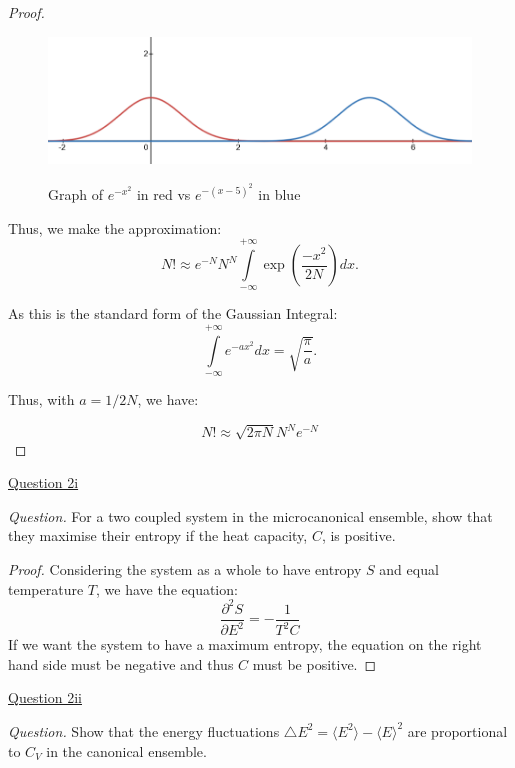 \documentclass[11pt]{article}
\begin{document}
\begin{proof}
\begin{figure}[H]
\centering \includegraphics[scale=0.7]{Question 1.1.png} \label{fig:FFTgen}
\caption{Graph of $e^{-x^2}$ in red vs $e^{-(x-5)^2}$ in blue}
\end{figure}
\newpage
Thus, we make the approximation:
\begin{equation}
    N! \approx e^{-N} N^N \int\limits_{-\infty}^{+\infty} \exp\left(\frac{-x^2}{2N}\right) dx.
\end{equation}

As this is the standard form of the Gaussian Integral:
\begin{equation}
    \int\limits_{-\infty}^{+\infty}e^{-ax^2} dx = \sqrt{\frac{\pi}{a}}.
\end{equation}

Thus, with $a= 1/2N$, we have:

\begin{equation}
    N! \approx \sqrt{2\pi N} N^N e^{-N}
\end{equation}
    
\end{proof}


\underline{Question 2i}

\textit{Question.} For a two coupled system in the microcanonical ensemble, show that they maximise their entropy if the heat capacity, $C$, is positive.

\begin{proof}
Considering the system as a whole to have entropy $S$ and equal temperature $T$, we have the equation:
\begin{equation}
    \frac{\partial^2S}{\partial E^2} = -\frac{1}{T^2C}
\end{equation}
If we want the system to have a maximum entropy, the equation on the right hand side must be negative and thus $C$ must be positive.

\end{proof}

\underline{Question 2ii}

\textit{Question.} Show that the energy fluctuations $\triangle E^2 = \langle E^2 \rangle - \langle E\rangle ^2$ are proportional to $C_V$ in the canonical ensemble.
\end{document}
